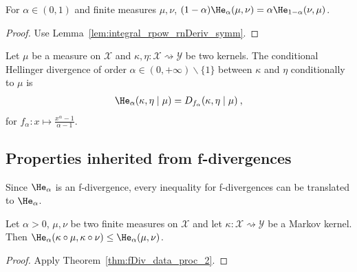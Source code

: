 \begin{lemma}
  \label{lem:hellingerAlpha_symm}
  \leanok
  For $\alpha \in (0, 1)$ and finite measures $\mu, \nu$, $(1 - \alpha) \He_\alpha(\mu, \nu) = \alpha \He_{1 - \alpha}(\nu, \mu)$.
\end{lemma}

\begin{proof}\leanok
{}
Use Lemma~\ref{lem:integral_rpow_rnDeriv_symm}.
\end{proof}


\begin{definition}
  \label{def:condHellingerAlpha}
  \leanok
  Let $\mu$ be a measure on $\mathcal X$ and $\kappa, \eta : \mathcal X \rightsquigarrow \mathcal Y$ be two kernels. The conditional Hellinger divergence of order $\alpha \in (0,+\infty) \backslash \{1\}$ between $\kappa$ and $\eta$ conditionally to $\mu$ is
  \begin{align*}
  \He_\alpha(\kappa, \eta \mid \mu) = D_{f_\alpha}(\kappa, \eta \mid \mu) \: ,
  \end{align*}
  for $f_\alpha : x \mapsto \frac{x^{\alpha} - 1}{\alpha - 1}$.
\end{definition}


\subsection{Properties inherited from f-divergences}

Since $\He_\alpha$ is an f-divergence, every inequality for f-divergences can be translated to $\He_\alpha$.

\begin{theorem}
  \label{thm:hellingerAlpha_data_proc}
  \leanok
  Let $\alpha > 0$, $\mu, \nu$ be two finite measures on $\mathcal X$ and let $\kappa : \mathcal X \rightsquigarrow \mathcal Y$ be a Markov kernel.
  Then $\He_\alpha(\kappa \circ \mu, \kappa \circ \nu) \le \He_\alpha(\mu, \nu)$.
\end{theorem}

\begin{proof} \leanok
{}
Apply Theorem~\ref{thm:fDiv_data_proc_2}.
\end{proof}


